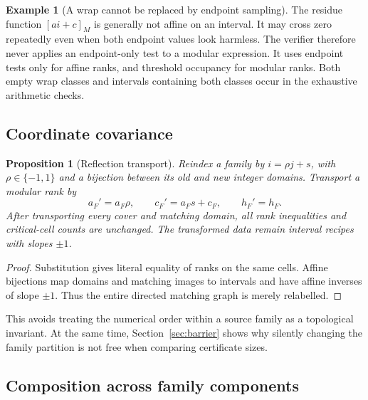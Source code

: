 \documentclass[11pt,letterpaper]{article}
\newtheorem{proposition}[theorem]{Proposition}
\theoremstyle{definition}
\newtheorem{example}[theorem]{Example}
\theoremstyle{remark}\newtheorem{remark}[theorem]{Remark}
\newcommand{\res}[2]{\left[#1\right]_{#2}}
\begin{document}
\begin{example}[A wrap cannot be replaced by endpoint sampling]
The residue function $\res{ai+c}{M}$ is generally not affine on an interval. It may cross zero repeatedly even when both endpoint values look harmless. The verifier therefore never applies an endpoint-only test to a modular expression. It uses endpoint tests only for affine ranks, and threshold occupancy for modular ranks. Both empty wrap classes and intervals containing both classes occur in the exhaustive arithmetic checks.
\end{example}

\subsection{Coordinate covariance}

\begin{proposition}[Reflection transport]
\label{prop:reflection}
Reindex a family by $i=\rho j+s$, with $\rho\in\{-1,1\}$ and a bijection between its old and new integer domains. Transport a modular rank by
\[
            a_F'=a_F\rho,\qquad c_F'=a_Fs+c_F,
            \qquad h_F'=h_F.
\]
After transporting every cover and matching domain, all rank inequalities and critical-cell counts are unchanged. The transformed data remain interval recipes with slopes $\pm1$.
\end{proposition}
\begin{proof}
Substitution gives literal equality of ranks on the same cells. Affine bijections map domains and matching images to intervals and have affine inverses of slope $\pm1$. Thus the entire directed matching graph is merely relabelled.
\end{proof}

This avoids treating the numerical order within a source family as a topological invariant. At the same time, Section~\ref{sec:barrier} shows why silently changing the family partition is not free when comparing certificate sizes.

\subsection{Composition across family components}
\end{document}
